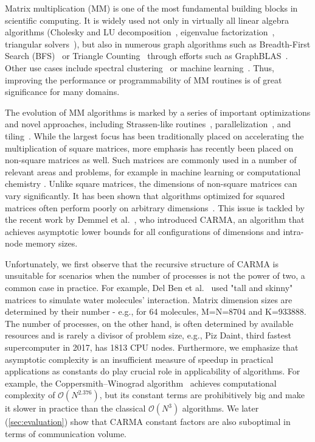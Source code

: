 \documentclass[sigplan,review,anonymous]{acmart}\settopmatter{printfolios=true,printccs=false,printacmref=false}
\begin{document}
Matrix multiplication (MM) is one of the most fundamental building blocks in
scientific computing. It is widely used not only in virtually all linear
algebra algorithms (Cholesky and LU decomposition~\cite{meyer2000matrix},
eigenvalue factorization~\cite{chatelin2012eigenvalues}, triangular
solvers~\cite{linearAlgebraLAPACK}), but also in numerous graph algorithms such
as Breadth-First Search (BFS)~\cite{cormen2009introduction} or Triangle
Counting~\cite{azad2015parallel} through efforts such as
GraphBLAS~\cite{kepner2016mathematical}.  Other use cases include spectral
clustering~\cite{ng2002spectral} or machine
learning~\cite{abadi2016tensorflow}.  Thus, improving the performance or
programmability of MM routines is of great significance for many domains.

%
The evolution of MM algorithms is marked by a series of important optimizations
and novel approaches, including Strassen-like routines~\cite{Strassen}, 
parallelization~\cite{parallelMMM},
and tiling~\cite{tiling}.
%
While the largest focus has been traditionally placed on accelerating the
multiplication of square matrices, more emphasis has recently been placed on
non-square matrices as well. Such matrices are commonly used in a number of
relevant areas and problems, for example in machine learning
\cite{rectangularML} or computational chemistry \cite{rectangularChemistry}.
%
Unlike square matrices, the dimensions of non-square matrices can vary
significantly.
It has been shown that algorithms optimized for squared matrices often perform 
poorly on arbitrary dimensions~\cite{CARMA}.
%
This issue is tackled by the recent work by Demmel et al.~\cite{CARMA}, who
introduced CARMA, an algorithm that achieves asymptotic lower bounds for all 
configurations of dimensions and intra-node memory sizes.

Unfortunately, we first observe that the recursive structure of CARMA is
unsuitable for scenarios when the number of processes is not the power of two,
a common case in practice. For example, Del Ben et al.~\cite{joost} used "tall 
and skinny" matrices to simulate water molecules' interaction. Matrix dimension 
sizes are 
determined by their number - e.g., for 64 molecules, M=N=8704 and K=933888. 
The number of processes, on the other hand, is often determined by available 
resources and is 
rarely a divisor of problem size, e.g., Piz Daint, third fastest supercomputer 
in 2017, has 1813 CPU nodes. 
Furthermore, we emphasize that asymptotic complexity is an
insufficient measure of speedup in practical applications as constants do play
crucial role in applicability of algorithms. For example, the
Coppersmith--Winograd algorithm~\cite{coppersmith} achieves computational
complexity of $\mathcal{O}(N^{2.376})$, but its constant terms are 
prohibitively big and
make it slower in practice than the classical $\mathcal{O}(N^{3})$ algorithms. 
We later (\cref{sec:evaluation}) show that CARMA constant factors are also 
suboptimal in terms of communication volume.
\end{document}
